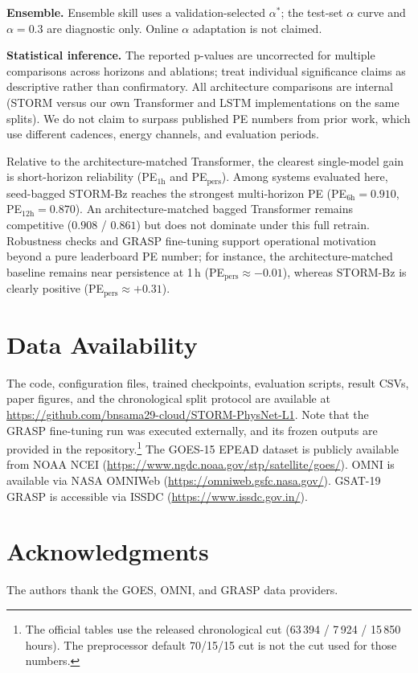\documentclass[conference]{IEEEtran}
\begin{document}
\textbf{Ensemble.} Ensemble skill uses a validation-selected \(\alpha^*\); the test-set \(\alpha\) curve and \(\alpha=0.3\) are diagnostic only. Online \(\alpha\) adaptation is not claimed.

\textbf{Statistical inference.} The reported p-values are uncorrected for multiple comparisons across horizons and ablations; treat individual significance claims as descriptive rather than confirmatory. All architecture comparisons are internal (STORM versus our own Transformer and LSTM implementations on the same splits). We do not claim to surpass published PE numbers from prior work, which use different cadences, energy channels, and evaluation periods.

Relative to the architecture-matched Transformer, the clearest single-model gain is short-horizon
reliability (PE$_{1\mathrm{h}}$ and PE$_{\mathrm{pers}}$).
Among systems evaluated here, seed-bagged STORM-Bz
reaches the strongest multi-horizon PE
(PE$_{6\mathrm{h}}=0.910$, PE$_{12\mathrm{h}}=0.870$).
An architecture-matched bagged Transformer remains competitive
($0.908$ / $0.861$) but does not dominate under this full retrain.
Robustness checks and GRASP fine-tuning support operational motivation beyond a pure leaderboard PE number; for instance, the architecture-matched baseline remains near persistence at 1\,h (PE$_{\mathrm{pers}}\approx-0.01$), whereas STORM-Bz is clearly positive (PE$_{\mathrm{pers}}\approx+0.31$).



\section*{Data Availability}
The code, configuration files, trained checkpoints, evaluation scripts,
result CSVs, paper figures, and the chronological split protocol are
available at
\url{https://github.com/bnsama29-cloud/STORM-PhysNet-L1}. Note that the GRASP fine-tuning run was executed externally, and its frozen outputs are provided in the repository.\footnote{The official tables use the released chronological cut
(63\,394 / 7\,924 / 15\,850 hours). The preprocessor default 70/15/15
cut is not the cut used for those numbers.}
The GOES-15 EPEAD dataset is publicly available from NOAA NCEI
(\url{https://www.ngdc.noaa.gov/stp/satellite/goes/}).
OMNI is available via NASA OMNIWeb
(\url{https://omniweb.gsfc.nasa.gov/}).
GSAT-19 GRASP is accessible via ISSDC
(\url{https://www.issdc.gov.in/}). 

\section*{Acknowledgments}
The authors thank the GOES, OMNI, and GRASP data providers.
\end{document}
